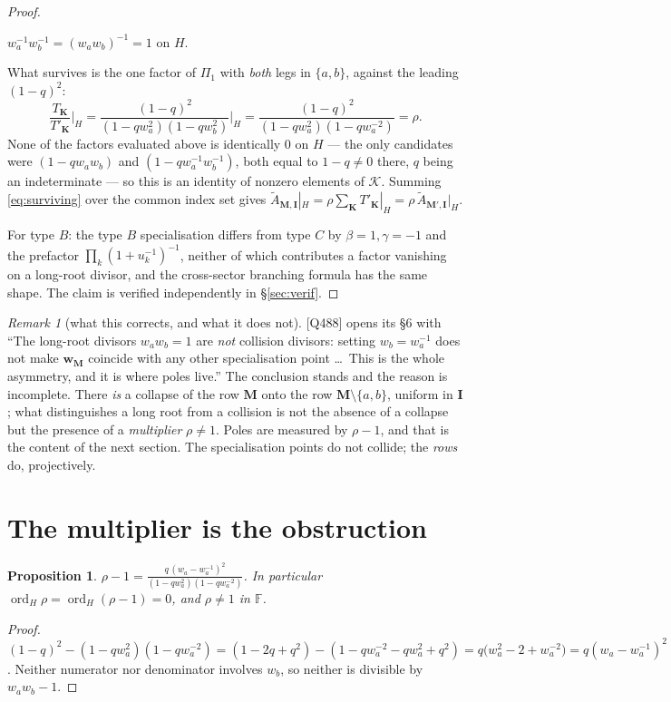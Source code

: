 \documentclass[11pt]{article}
\theoremstyle{plain}
\newtheorem{prop}[thm]{Proposition}
\theoremstyle{definition}
\theoremstyle{remark}
\newtheorem{rem}[thm]{Remark}
\theoremstyle{plain}
\newcommand{\bI}{\mathbf{I}}
\newcommand{\bM}{\mathbf{M}}
\newcommand{\bK}{\mathbf{K}}
\newcommand{\bw}{\mathbf{w}}
\newcommand{\At}{\widetilde{A}}
\newcommand{\ord}{\operatorname{ord}}
\begin{document}
\begin{proof}
\begin{itemize}
 $w_a^{-1}w_b^{-1}=(w_aw_b)^{-1}=1$ on $H$.
\end{itemize}
What survives is the one factor of $\Pi_1$ with \emph{both} legs in $\{a,b\}$,
against the leading $(1-q)^2$:
\[
\frac{T_{\bK}}{T'_{\bK}}\bigg|_H
=\frac{(1-q)^2}{(1-qw_a^2)(1-qw_b^2)}\bigg|_H
=\frac{(1-q)^2}{(1-qw_a^2)(1-qw_a^{-2})}=\rho .
\]
None of the factors evaluated above is identically $0$ on $H$ --- the only
candidates were $(1-qw_aw_b)$ and $(1-qw_a^{-1}w_b^{-1})$, both equal to
$1-q\ne0$ there, $q$ being an indeterminate --- so this is an identity of
nonzero elements of $\mathcal{K}$.  Summing \eqref{eq:surviving} over the
common index set gives
$\At_{\bM,\bI}|_H=\rho\sum_{\bK}T'_{\bK}|_H=\rho\,\At_{\bM',\bI}|_H$.

For type $B$: the type $B$ specialisation differs from type $C$ by
$\beta=1,\gamma=-1$ and the prefactor $\prod_k(1+u_k^{-1})^{-1}$, neither of
which contributes a factor vanishing on a long-root divisor, and the
cross-sector branching formula has the same shape.  The claim is verified
independently in \S\ref{sec:verif}.
\end{proof}

\begin{rem}[what this corrects, and what it does not]
[Q488] opens its \S6 with ``The long-root divisors $w_aw_b=1$ are \emph{not}
collision divisors: setting $w_b=w_a^{-1}$ does not make $\bw_{\bM}$ coincide
with any other specialisation point \dots\ This is the whole asymmetry, and it
is where poles live.''  The conclusion stands and the reason is incomplete.
There \emph{is} a collapse of the row $\bM$ onto the row
$\bM\setminus\{a,b\}$, uniform in $\bI$; what distinguishes a long root from a
collision is not the absence of a collapse but the presence of a
\emph{multiplier} $\rho\ne1$.  Poles are measured by $\rho-1$, and that is the
content of the next section.  The specialisation points do not collide; the
\emph{rows} do, projectively.
\end{rem}

\section{The multiplier is the obstruction}
\label{sec:multiplier}

\begin{prop}\label{prop:rho}
$\displaystyle
\rho-1=\frac{q\,(w_a-w_a^{-1})^2}{(1-qw_a^2)(1-qw_a^{-2})}$.
In particular $\ord_H\rho=\ord_H(\rho-1)=0$, and $\rho\neq1$ in
$\mathbb{F}$.
\end{prop}
\begin{proof}
$(1-q)^2-(1-qw_a^2)(1-qw_a^{-2})
=(1-2q+q^2)-(1-qw_a^{-2}-qw_a^{2}+q^2)
=q\bigl(w_a^2-2+w_a^{-2}\bigr)=q(w_a-w_a^{-1})^2$.
Neither numerator nor denominator involves $w_b$, so neither is divisible by
$w_aw_b-1$.
\end{proof}
\end{document}
